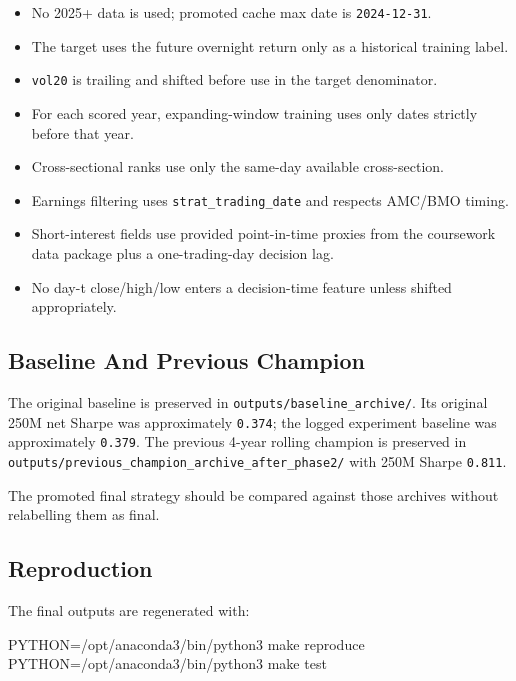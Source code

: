 \documentclass[
  10pt,
]{article}
\newenvironment{Shaded}{}{}
\newcommand{\FunctionTok}[1]{\textcolor[rgb]{0.02,0.16,0.49}{#1}}
\newcommand{\NormalTok}[1]{#1}
\newcommand{\OperatorTok}[1]{\textcolor[rgb]{0.40,0.40,0.40}{#1}}
\newcommand{\VariableTok}[1]{\textcolor[rgb]{0.10,0.09,0.49}{#1}}
\providecommand{\tightlist}{%
  \setlength{\itemsep}{0pt}\setlength{\parskip}{0pt}}
\begin{document}
\begin{itemize}
\tightlist
\item
  No 2025+ data is used; promoted cache max date is \texttt{2024-12-31}.
\item
  The target uses the future overnight return only as a historical
  training label.
\item
  \texttt{vol20} is trailing and shifted before use in the target
  denominator.
\item
  For each scored year, expanding-window training uses only dates
  strictly before that year.
\item
  Cross-sectional ranks use only the same-day available cross-section.
\item
  Earnings filtering uses \texttt{strat\_trading\_date} and respects
  AMC/BMO timing.
\item
  Short-interest fields use provided point-in-time proxies from the
  coursework data package plus a one-trading-day decision lag.
\item
  No day-t close/high/low enters a decision-time feature unless shifted
  appropriately.
\end{itemize}

\hypertarget{baseline-and-previous-champion}{%
\subsection{Baseline And Previous
Champion}\label{baseline-and-previous-champion}}

The original baseline is preserved in
\texttt{outputs/baseline\_archive/}. Its original 250M net Sharpe was
approximately \texttt{0.374}; the logged experiment baseline was
approximately \texttt{0.379}. The previous 4-year rolling champion is
preserved in
\texttt{outputs/previous\_champion\_archive\_after\_phase2/} with 250M
Sharpe \texttt{0.811}.

The promoted final strategy should be compared against those archives
without relabelling them as final.

\hypertarget{reproduction}{%
\subsection{Reproduction}\label{reproduction}}

The final outputs are regenerated with:

\begin{Shaded}
\begin{Highlighting}[]
\VariableTok{PYTHON}\OperatorTok{=}\NormalTok{/opt/anaconda3/bin/python3 }\FunctionTok{make}\NormalTok{ reproduce}
\VariableTok{PYTHON}\OperatorTok{=}\NormalTok{/opt/anaconda3/bin/python3 }\FunctionTok{make}\NormalTok{ test}
\end{Highlighting}
\end{Shaded}
\end{document}
